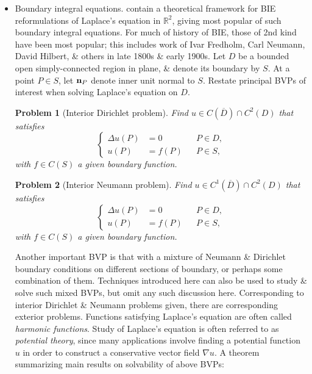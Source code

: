 \documentclass{article}
\newtheorem{problem}{Problem}
\begin{document}
\begin{enumerate}
\begin{itemize}
		\begin{itemize}
			\item {\sf Boundary integral equations.} contain a theoretical framework for BIE reformulations of Laplace's equation in $\mathbb{R}^2$, giving most popular of such boundary integral equations. For much of history of BIE, those of 2nd kind have been most popular; this includes work of {\sc Ivar Fredholm, Carl Neumann, David Hilbert}, \& others in late 1800s \& early 1900s. Let $D$ be a bounded open simply-connected region in plane, \& denote its boundary by $S$. At a point $P\in S$, let ${\bf n}_P$ denote inner unit normal to $S$. Restate principal BVPs of interest when solving Laplace's equation on $D$.
			
			\begin{problem}[Interior Dirichlet problem]
				Find $u\in C(\overline{D})\cap C^2(D)$ that satisfies
				\begin{equation}
					\label{interior Dirichlet prob}
					\left\{\begin{split}
						\Delta u(P) &= 0&&P\in D,\\
						u(P) &= f(P)&&P\in S,
					\end{split}\right.
				\end{equation}
				with $f\in C(S)$ a given boundary function.
			\end{problem}
			
			\begin{problem}[Interior Neumann problem]
				Find $u\in C^1(\overline{D})\cap C^2(D)$ that satisfies
				\begin{equation}
					\label{interior Neumann prob}
					\left\{\begin{split}
						\Delta u(P) &= 0&&P\in D,\\
						u(P) &= f(P)&&P\in S,
					\end{split}\right.
				\end{equation}
				with $f\in C(S)$ a given boundary function.
			\end{problem}
			Another important BVP is that with a mixture of Neumann \& Dirichlet boundary conditions on different sections of boundary, or perhaps some combination of them. Techniques introduced here can also be used to study \& solve such mixed BVPs, but omit any such discussion here. Corresponding to interior Dirichlet \& Neumann problems given, there are corresponding exterior problems. Functions satisfying Laplace's equation are often called {\it harmonic functions}. Study of Laplace's equation is often referred to as {\it potential theory}, since many applications involve finding a potential function $u$ in order to construct a conservative vector field $\nabla u$. A theorem summarizing main results on solvability of above BVPs:
			

\end{itemize}
\end{itemize}
\end{enumerate}
\end{document}
